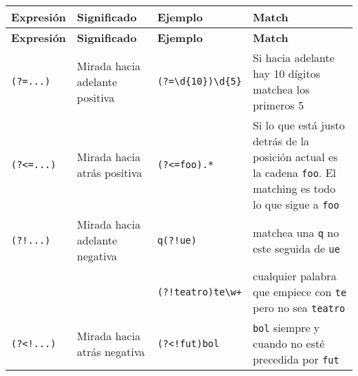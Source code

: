 \documentclass[a4paper, 10pt]{article}
\begin{document}
\begin{longtable}{@{} p{2cm} p{5cm} p{3cm} p{7.5cm} @{}}
\toprule
\textbf{Expresión} & \textbf{Significado} & \textbf{Ejemplo} & \textbf{Match} \\
\midrule
\endfirsthead
\toprule
\textbf{Expresión} & \textbf{Significado} & \textbf{Ejemplo} & \textbf{Match} \\
\midrule
\endhead
\bottomrule
\endfoot
\bottomrule
\endlastfoot

\centering \verb!(?=...)!  & Mirada hacia adelante positiva & \verb!(?=\d{10})\d{5}! & Si hacia adelante hay 10 dígitos matchea los primeros 5                                                                  \\
\centering \verb!(?<=...)! & Mirada hacia atrás positiva    & \verb!(?<=foo).*!      & Si lo que está justo detrás de la posición actual es la cadena \verb!foo!. El matching es todo lo que sigue a \verb!foo! \\
\centering \verb|(?!...)|  & Mirada hacia adelante negativa & \verb|q(?!ue)|         & matchea una \verb!q! no este seguida de \verb!ue!                                                                        \\
                           &                                & \verb|(?!teatro)te\w+| & cualquier palabra que empiece con \verb!te! pero no sea \verb!teatro!                                                    \\
\centering \verb|(?<!...)| & Mirada hacia atrás negativa    & \verb|(?<!fut)bol|     & \verb!bol! siempre y cuando no esté precedida por \verb!fut!                                                             \\
\end{longtable}
\end{document}
